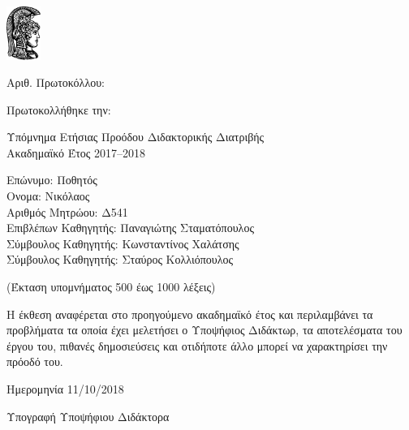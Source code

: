 \documentclass[a4paper]{article}
\begin{document}

\includegraphics[width=3em]{athena}

Αριθ. Πρωτοκόλλου:

Πρωτοκολλήθηκε την:

Υπόμνημα Ετήσιας Προόδου Διδακτορικής Διατριβής \\
Ακαδημαϊκό Έτος 2017–2018

Επώνυμο: Ποθητός \\
Ονομα: Νικόλαος \\
Αριθμός Μητρώου: Δ541 \\
Επιβλέπων Καθηγητής: Παναγιώτης Σταματόπουλος \\
Σύμβουλος Καθηγητής: Κωνσταντίνος Χαλάτσης \\
Σύμβουλος Καθηγητής: Σταύρος Κολλιόπουλος

(Έκταση υπομνήματος 500 έως 1000 λέξεις)

Η έκθεση αναφέρεται στο προηγούμενο ακαδημαϊκό έτος και περιλαμβάνει τα προβλήματα τα οποία έχει μελετήσει ο Υποψήφιος Διδάκτωρ, τα αποτελέσματα του έργου του, πιθανές δημοσιεύσεις και οτιδήποτε άλλο μπορεί να χαρακτηρίσει την πρόοδό του.

Ημερομηνία 11/10/2018

Υπογραφή Υποψήφιου Διδάκτορα
\end{document}
